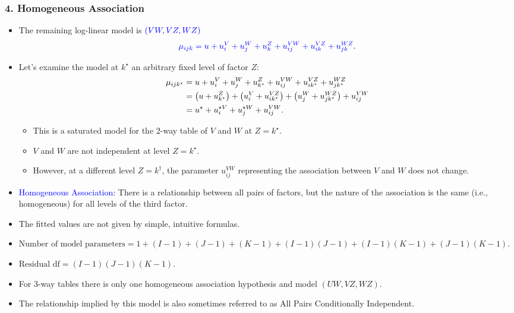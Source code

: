 \documentclass[oneside]{book}\usepackage[]{graphicx}\usepackage[svgnames]{xcolor}
\let\log\relax%
\begin{document}
\subsubsection*{4. Homogeneous Association}
\begin{itemize}
      \item The remaining log-linear model is $ \textcolor{Blue}{(VW,VZ,WZ)} $
            \[ \textcolor{Blue}{\log{\mu_{ijk}}=u+u_i^V+u_j^W+u_k^Z+u_{ij}^{VW}+u_{ik}^{VZ}+u_{jk}^{WZ}}. \]
      \item Let's examine the model at $ k^\star $ an arbitrary fixed level of factor $ Z $:
            \begin{align*}
                  \log \mu_{i j k^{\star}} & =u+u_{i}^{V}+u_{j}^{W}+u_{k^{\star}}^{Z}+u_{i j}^{V W}+u_{i k^{\star}}^{V Z}+u_{j k^{\star}}^{W Z}                                        \\
                                           & =\left(u+u_{k^{\star}}^{Z}\right)+\left(u_{i}^{V}+u_{i k^{\star}}^{V Z}\right)+\left(u_{j}^{W}+u_{j k^{\star}}^{W Z}\right)+u_{i j}^{V W} \\
                                           & =u^{\star}+u_{i}^{\star V}+u_{j}^{\star W}+u_{i j}^{V W}.
            \end{align*}
            \begin{itemize}
                  \item This is a saturated model for the 2-way table of $ V $ and $ W $ at $ Z=k^\star $.
                  \item $ V $ and $ W $ are not independent at level $ Z=k^\star $.
                  \item However, at a different level $ Z=k^\dagger $, the parameter $ u_{ij}^{VW} $ representing the association between $ V $ and $ W $
                        does not change.
            \end{itemize}
      \item \textcolor{Blue}{Homogeneous Association}: There is a relationship between all pairs of factors, but
            the nature of the association is the same (i.e., homogeneous) for all levels of the
            third factor.
      \item The fitted values are not given by simple, intuitive formulas.
      \item $ \text{Number of model parameters}=1 + (I- 1) + (J- 1) + (K- 1) + (I- 1)(J- 1) + (I- 1)(K- 1) + (J- 1)(K- 1) $.
      \item $ \text{Residual df}=(I- 1)(J- 1)(K- 1) $.
      \item For 3-way tables there is only one homogeneous association hypothesis and model
            $(UW, VZ, WZ)$.
      \item The relationship implied by this model is also sometimes referred to as All Pairs
            Conditionally Independent.
\end{itemize}
\end{document}

